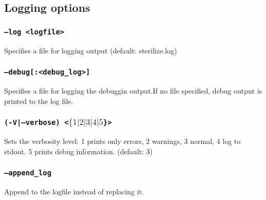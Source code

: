 \subsection{Logging options}

\subsubsection{\texttt{--log <logfile>}}
Specifies a file for logging output (default: sterilize.log)

\subsubsection{\texttt{--debug[:<debug\_log>]}}
Specifies a file for logging the debuggin output.If no file
specified, debug output is printed to the log file.

\subsubsection{\texttt{(-V|--verbose) <$\{1|2|3|4|5$\}>}}
Sets the verbosity level:
1 prints only errors, 
2 warnings, 
3 normal, 
4 log to stdout. 
5 prints debug information. 
(default: 3)

\subsubsection{\texttt{--append\_log }}
Append to the logfile instead of replacing it.
